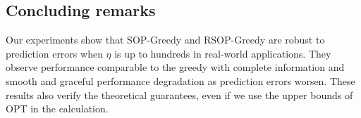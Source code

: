 \subsection{Concluding remarks}
Our experiments show that SOP-Greedy and RSOP-Greedy are robust to prediction errors when $\eta$ is up to hundreds in real-world applications. They observe performance comparable to the greedy with complete information and smooth and graceful performance degradation as prediction errors worsen. These results also verify the theoretical guarantees, even if we use the upper bounds of OPT in the calculation. 


